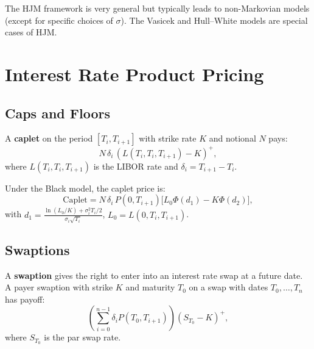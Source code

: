 \begin{remark}
The HJM framework is very general but typically leads to non-Markovian
models (except for specific choices of $\sigma$). The Vasicek and Hull--White
models are special cases of HJM.
\end{remark}

\section{Interest Rate Product Pricing}

\subsection{Caps and Floors}

\begin{definition}[Caplet]
A \textbf{caplet} on the period $[T_i, T_{i+1}]$ with strike rate $K$
and notional $N$ pays:
\[
    N\,\delta_i\,(L(T_i, T_i, T_{i+1}) - K)^+,
\]
where $L(T_i, T_i, T_{i+1})$ is the LIBOR rate and $\delta_i = T_{i+1} - T_i$.
\end{definition}

\begin{theorem}
Under the Black model, the caplet price is:
\[
    \text{Caplet} = N\,\delta_i\,P(0,T_{i+1})
    \bigl[L_0\Phi(d_1) - K\Phi(d_2)\bigr],
\]
with $d_1 = \frac{\ln(L_0/K) + \sigma_i^2 T_i/2}{\sigma_i\sqrt{T_i}}$,
$L_0 = L(0, T_i, T_{i+1})$.
\end{theorem}

\subsection{Swaptions}

\begin{definition}[Swaption]
A \textbf{swaption} gives the right to enter into an interest rate swap at
a future date. A payer swaption with strike $K$ and maturity $T_0$ on a
swap with dates $T_0, \ldots, T_n$ has payoff:
\[
    \left(\sum_{i=0}^{n-1}\delta_i P(T_0, T_{i+1})\right)
    (S_{T_0} - K)^+,
\]
where $S_{T_0}$ is the par swap rate.
\end{definition}

